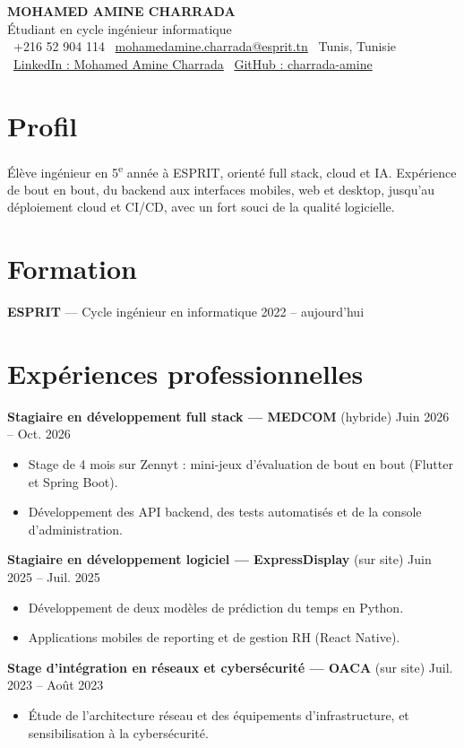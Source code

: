 \documentclass[10.5pt,a4paper]{article}
\newcommand{\entry}[2]{\noindent #1 \hfill #2\par}
\newenvironment{tasks}{\begin{itemize}[leftmargin=2.6em,topsep=3pt]}{\end{itemize}\vspace{3pt}}
\begin{document}
\begin{center}
  {\LARGE\bfseries MOHAMED AMINE CHARRADA}\\[4pt]
  Étudiant en cycle ingénieur informatique\\[3pt]
  \faPhone*\ +216 52 904 114 \quad
  \faEnvelope\ \href{mailto:mohamedamine.charrada@esprit.tn}{mohamedamine.charrada@esprit.tn} \quad
  \faMapMarker*\ Tunis, Tunisie\\
  \faLinkedin\ \href{https://www.linkedin.com/in/mohamed-amine-charrada-17a494315/}{LinkedIn : Mohamed Amine Charrada} \quad
  \faGithub\ \href{https://github.com/charrada-amine}{GitHub : charrada-amine}
\end{center}

\section*{Profil}
Élève ingénieur en 5\textsuperscript{e} année à ESPRIT, orienté full stack, cloud et IA. Expérience de bout en bout, du backend
aux interfaces mobiles, web et desktop, jusqu’au déploiement cloud et CI/CD, avec un fort souci de la qualité logicielle.

\section*{Formation}
\entry{\textbf{ESPRIT} — Cycle ingénieur en informatique}{2022 – aujourd’hui}

\section*{Expériences professionnelles}
\entry{\textbf{Stagiaire en développement full stack — MEDCOM} (hybride)}{Juin 2026 – Oct. 2026}
\begin{tasks}
  \item Stage de 4 mois sur Zennyt : mini-jeux d’évaluation de bout en bout (Flutter et Spring Boot).
  \item Développement des API backend, des tests automatisés et de la console d’administration.
\end{tasks}
\entry{\textbf{Stagiaire en développement logiciel — ExpressDisplay} (sur site)}{Juin 2025 – Juil. 2025}
\begin{tasks}
  \item Développement de deux modèles de prédiction du temps en Python.
  \item Applications mobiles de reporting et de gestion RH (React Native).
\end{tasks}
\entry{\textbf{Stage d’intégration en réseaux et cybersécurité — OACA} (sur site)}{Juil. 2023 – Août 2023}
\begin{tasks}
  \item Étude de l’architecture réseau et des équipements d’infrastructure, et sensibilisation à la cybersécurité.
\end{tasks}
\end{document}
